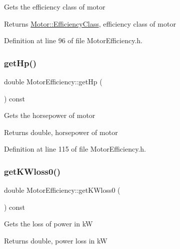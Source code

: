 Gets the efficiency class of motor

\begin{DoxyReturn}{Returns}
\hyperlink{class_motor_afa022971ae062406a9f588c601673d4e}{Motor\+::\+Efficiency\+Class}, efficiency class of motor 
\end{DoxyReturn}


Definition at line 96 of file Motor\+Efficiency.\+h.

\mbox{\label{class_motor_efficiency_a9f88159c82daa270975d7969debe88a9}} 
\subsubsection{\texorpdfstring{get\+Hp()}{getHp()}}
{\footnotesize\ttfamily double Motor\+Efficiency\+::get\+Hp (\begin{DoxyParamCaption}{ }\end{DoxyParamCaption}) const\hspace{0.3cm}{\ttfamily [inline]}}

Gets the horsepower of motor

\begin{DoxyReturn}{Returns}
double, horsepower of motor 
\end{DoxyReturn}


Definition at line 115 of file Motor\+Efficiency.\+h.

\mbox{\label{class_motor_efficiency_a47398ac8203f5b79a0ca435673a4bc16}} 
\subsubsection{\texorpdfstring{get\+K\+Wloss0()}{getKWloss0()}}
{\footnotesize\ttfamily double Motor\+Efficiency\+::get\+K\+Wloss0 (\begin{DoxyParamCaption}{ }\end{DoxyParamCaption}) const\hspace{0.3cm}{\ttfamily [inline]}}

Gets the loss of power in kW

\begin{DoxyReturn}{Returns}
double, power loss in kW 
\end{DoxyReturn}


